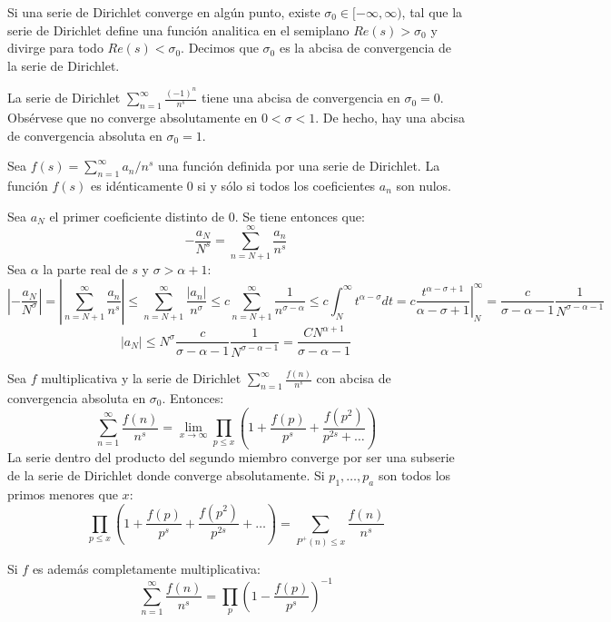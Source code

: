 \documentclass[TAN.tex]{subfiles}
\begin{document}
\begin{coro}
Si una serie de Dirichlet converge en algún punto, existe $σ_0 \in [-\infty,\infty)$, tal que la serie de Dirichlet define una función analitica en el semiplano $Re(s) > σ_0$ y divirge para todo $Re(s) < σ_0$. Decimos que $σ_0$ es la abcisa de convergencia de la serie de Dirichlet.
\end{coro}

\begin{ej}
La serie de Dirichlet $\sum_{n=1}^\infty \frac{(-1)^n}{n^s}$ tiene una abcisa de convergencia en $σ_0=0$. Obsérvese que no converge absolutamente en $0<σ<1$. De hecho, hay una abcisa de convergencia absoluta en $σ_0=1$.
\end{ej}

\begin{prop} Sea $f(s) = \sum_{n=1}^\infty a_n/n^s$ una función definida por una serie de Dirichlet. La función $f(s)$ es idénticamente $0$ si y sólo si todos los coeficientes $a_n$ son nulos.
\end{prop}
\begin{dem}
Sea $a_N$ el primer coeficiente distinto de 0. Se tiene entonces que:
\[ -\frac{a_N}{N^s} = \sum_{n=N+1}^{∞} \frac{a_n}{n^s} \]
Sea $α$ la parte real de $s$ y $σ > α+1$:
\[ \left|-\frac{a_N}{N^σ}\right| = \left|\sum_{n=N+1}^{∞} \frac{a_n}{n^s}\right| ≤ \sum_{n=N+1}^{∞} \frac{|a_n|}{n^σ} ≤ c \sum_{n=N+1}^{∞} \frac{1}{n^{σ-α}} ≤ c \int_N^{∞} t^{α-σ} dt = c \left.\frac{t^{α-σ+1}}{α-σ+1}\right|_N^{∞} = \frac{c}{σ-α-1} \frac{1}{N^{σ-α-1}}\]
\[ |a_N| ≤ N^σ \frac{c}{σ-α-1} \frac{1}{N^{σ-α-1}} = \frac{CN^{α+1}}{σ-α-1} \]
\end{dem}

\begin{prop} Sea $f$ multiplicativa y la serie de Dirichlet $\sum_{n=1}^\infty \frac{f(n)}{n^s}$ con abcisa de convergencia absoluta en $σ_0$. Entonces:
\[ \sum_{n=1}^\infty \frac{f(n)}{n^s} = \lim_{x \to \infty} \prod_{p≤x} \left(1+\frac{f(p)}{p^s} + \frac{f(p^2)}{p^{2s}+\dots}\right) \]
La serie dentro del producto del segundo miembro converge por ser una subserie de la serie de Dirichlet donde converge absolutamente. Si $p_1,\dots,p_a$ son todos los primos menores que $x$:
\[ \prod_{p≤x} \left(1+\frac{f(p)}{p^s} + \frac{f(p^2)}{p^{2s}}+\dots\right) = \sum_{P^+(n)≤x} \frac{f(n)}{n^s} \]
\end{prop}

\begin{coro}

Si $f$ es además completamente multiplicativa:
\[ \sum_{n=1}^\infty \frac{f(n)}{n^s} = \prod_{p}\left(1-\frac{f(p)}{p^s}\right)^{-1}\]
\end{coro}
\end{document}
